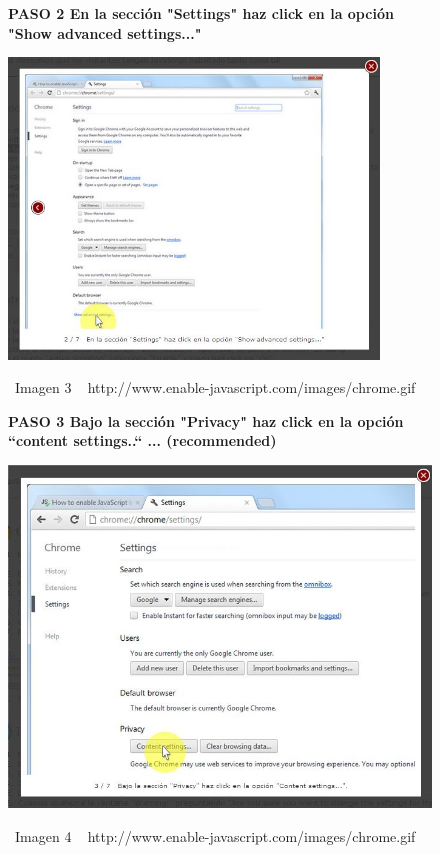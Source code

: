 \documentclass[11pt]{article} %
\begin{document}
\begin{figure}
\begin{center}
\begin{center}


\bf PASO 2
En la sección "Settings" haz click en la 
opción "Show advanced settings..."


\includegraphics[height=8cm, width=8 cm] {imagenes/chrome 02.jpg}
\end{center}
\  Imagen 3
\ { http://www.enable-javascript.com/images/chrome.gif }
\newline




\begin{center}
\bf PASO 3
Bajo la sección "Privacy" haz click en la opción 
``content settings..`` ... (recommended)
\newline

\includegraphics[height=8 cm, width=8 cm] {imagenes/chrome 03.jpg}
\end{center}
\ Imagen 4
\ { http://www.enable-javascript.com/images/chrome.gif }
\newline


\end{center}
\end{figure}
\end{document}
